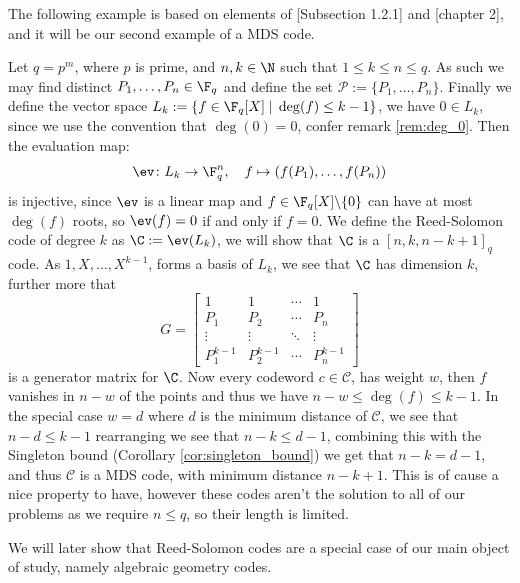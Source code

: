 The following example is based on elements of \citep{alg_geom_codes}[Subsection 1.2.1] and \citep{notes_on_alg_geom_codes}[chapter 2], and it will be our second example of a MDS code.
\begin{example}
  Let $q = p^{m}$, where $p$ is prime, and $n, k \in \N$ such that $1 \leq k \leq n \leq q$. As such we may find distinct $P_{1}, \ldots, P_{n} \in \F_{q}$ and define the set $\mathcal{P} := \{P_{1}, \ldots, P_{n}\}$. Finally we define the vector space $L_{k} := \{f \in \F_{q}[X] \;\vert\; \deg(f) \leq k - 1\}$, we have $0 \in L_{k}$, since we use the convention that $\deg(0) = 0$, confer remark \ref{rem:deg_0}.
  Then the evaluation map:
  \begin{align*}
    \ev\colon L_{k} \to \F_{q}^{n}, \quad f \mapsto (f(P_{1}), \ldots, f(P_{n}))
  \end{align*}
  is injective, since $\ev$ is a linear map and $f \in \F_{q}[X] \backslash \{0\}$ can have at most $\deg(f)$ roots, so $\ev(f) = 0$ if and only if $f = 0$.
  We define the Reed-Solomon code of degree $k$ as $\C := \ev(L_{k})$, we will show that $\C$ is a $[n, k, n - k + 1]_{q}$ code.
  As $1, X, \ldots, X^{k - 1}$, forms a basis of $L_{k}$, we see that $\C$ has dimension $k$, further more that
  \begin{equation*}
    G = \begin{bmatrix}
          1 & 1 & \cdots & 1\\
          P_{1} & P_{2} & \cdots & P_{n} \\
          \vdots & \vdots & \ddots & \vdots \\
          P_{1}^{k - 1} & P_{2}^{k - 1} & \cdots & P_{n}^{k -  1}
    \end{bmatrix}
  \end{equation*}
  is a generator matrix for $\C$.
  Now every codeword $c \in \mathcal{C}$, has weight $w$, then $f$ vanishes in $n - w$ of the points and thus we have $n - w \leq \deg(f) \leq k - 1$.
  In the special case $w = d$ where $d$ is the minimum distance of $\mathcal{C}$, we see that $n - d \leq k - 1$ rearranging we see that $n - k \leq d - 1$, combining this with the Singleton bound (Corollary \ref{cor:singleton_bound}) we get that $n - k = d - 1$, and thus $\mathcal{C}$ is a MDS code, with minimum distance $n - k + 1$. This is of cause a nice property to have, however these codes aren't the solution to all of our problems as we require $n \leq q$, so their length is limited.
\end{example}
We will later show that Reed-Solomon codes are a special case of our main object of study, namely algebraic geometry codes.
